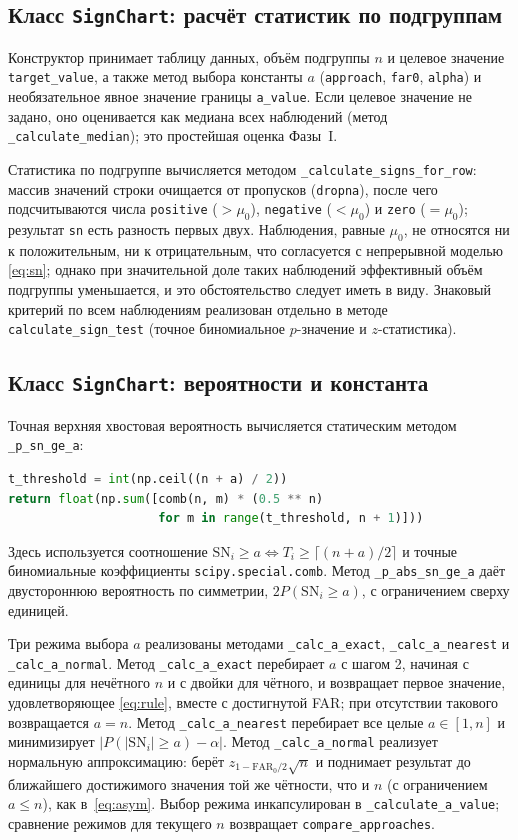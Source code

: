 \documentclass[11pt,a4paper]{article}
\newcommand{\SN}{\mathrm{SN}}
\begin{document}
\subsection{Класс \texttt{SignChart}: расчёт статистик по подгруппам}

Конструктор принимает таблицу данных, объём подгруппы $n$ и целевое значение
\texttt{target\_value}, а также метод выбора константы $a$
(\texttt{approach}, \texttt{far0}, \texttt{alpha}) и необязательное явное
значение границы \texttt{a\_value}. Если целевое значение не задано, оно оценивается
как медиана всех наблюдений (метод \texttt{\_calculate\_median}); это
простейшая оценка Фазы~I.

Статистика по подгруппе вычисляется методом
\texttt{\_calculate\_signs\_for\_row}: массив значений строки очищается от
пропусков (\texttt{dropna}), после чего подсчитываются числа
\texttt{positive} ($>\!\mu_0$), \texttt{negative} ($<\!\mu_0$) и
\texttt{zero} ($=\mu_0$); результат \texttt{sn} есть разность первых двух.
Наблюдения, равные $\mu_0$, не относятся ни к положительным, ни к
отрицательным, что согласуется с непрерывной моделью \eqref{eq:sn}; однако
при значительной доле таких наблюдений эффективный объём подгруппы
уменьшается, и это обстоятельство следует иметь в виду. Знаковый критерий по
всем наблюдениям реализован отдельно в методе \texttt{calculate\_sign\_test}
(точное биномиальное $p$-значение и $z$-статистика).

\subsection{Класс \texttt{SignChart}: вероятности и константа}

Точная верхняя хвостовая вероятность вычисляется статическим методом
\texttt{\_p\_sn\_ge\_a}:
\begin{lstlisting}[language=Python]
t_threshold = int(np.ceil((n + a) / 2))
return float(np.sum([comb(n, m) * (0.5 ** n)
                     for m in range(t_threshold, n + 1)]))
\end{lstlisting}
Здесь используется соотношение $\SN_i \ge a \Leftrightarrow T_i \ge
\lceil (n+a)/2 \rceil$ и точные биномиальные коэффициенты
\texttt{scipy.special.comb}. Метод \texttt{\_p\_abs\_sn\_ge\_a} даёт
двустороннюю вероятность по симметрии, $2P(\SN_i\ge a)$, с ограничением
сверху единицей.

Три режима выбора $a$ реализованы методами
\texttt{\_calc\_a\_exact}, \texttt{\_calc\_a\_nearest} и
\texttt{\_calc\_a\_normal}. Метод
\texttt{\_calc\_a\_exact} перебирает $a$ с шагом 2, начиная с единицы
для нечётного $n$ и с двойки для чётного, и возвращает первое значение,
удовлетворяющее \eqref{eq:rule}, вместе с достигнутой FAR; при отсутствии
такового возвращается $a=n$. Метод \texttt{\_calc\_a\_nearest} перебирает все
целые $a\in[1,n]$ и минимизирует $|P(|\SN_i|\ge a)-\alpha|$. Метод
\texttt{\_calc\_a\_normal} реализует нормальную аппроксимацию: берёт
$z_{1-\mathrm{FAR}_0/2}\sqrt n$ и поднимает результат до ближайшего
достижимого значения той же чётности, что и $n$ (с ограничением $a\le n$),
как в~\eqref{eq:asym}. Выбор режима инкапсулирован в
\texttt{\_calculate\_a\_value}; сравнение режимов для текущего $n$ возвращает
\texttt{compare\_approaches}.
\end{document}
